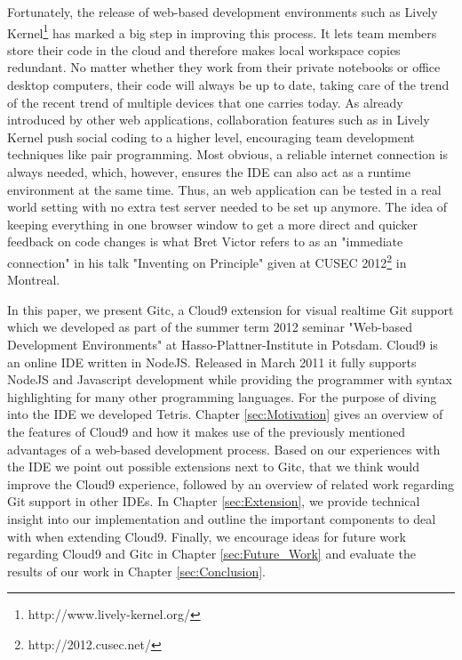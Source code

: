 Fortunately, the release of web-based development environments such as Lively Kernel\footnote{http://www.lively-kernel.org/} has marked a big step in improving this process. It lets team members store their code in the cloud and therefore makes local workspace copies redundant. No matter whether they work from their private notebooks or office desktop computers, their code will always be up to date, taking care of the trend of the recent trend of multiple devices that one carries today. As already introduced by other web applications, collaboration features such as in Lively Kernel push social coding to a higher level, encouraging team development techniques like pair programming. Most obvious, a reliable internet connection is always needed, which, however, ensures the IDE can also act as a runtime environment at the same time. Thus, an web application can be tested in a real world setting with no extra test server needed to be set up anymore. The idea of keeping everything in one browser window to get a more direct and quicker feedback on code changes is what Bret Victor refers to as an "immediate connection" in his talk "Inventing on Principle" given at CUSEC 2012\footnote{http://2012.cusec.net/} in Montreal.

In this paper, we present Gitc, a Cloud9 extension for visual realtime Git support which we developed as part of the summer term 2012 seminar "Web-based Development Environments" at Hasso-Plattner-Institute in Potsdam. Cloud9 is an online IDE written in NodeJS. Released in March 2011 it fully supports NodeJS and Javascript development while providing the programmer with syntax highlighting for many other programming languages. For the purpose of diving into the IDE we developed Tetris. Chapter \ref{sec:Motivation} gives an overview of the features of Cloud9 and how it makes use of the previously mentioned advantages of a web-based development process. Based on our experiences with the IDE we point out possible extensions next to Gitc, that we think would improve the Cloud9 experience, followed by an overview of related work regarding Git support in other IDEs. In Chapter \ref{sec:Extension}, we provide technical insight into our implementation and outline the important components to deal with when extending Cloud9. Finally, we encourage ideas for future work regarding Cloud9 and Gitc in Chapter \ref{sec:Future_Work} and evaluate the results of our work in Chapter \ref{sec:Conclusion}.